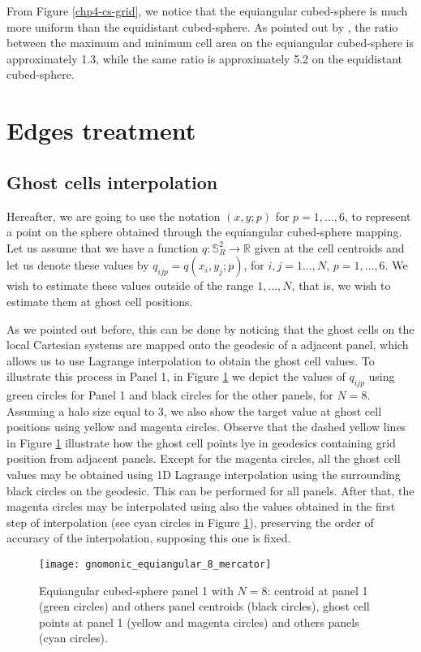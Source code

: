 From Figure \ref{chp4-cs-grid}, we notice that the equiangular cubed-sphere is much more uniform
than the equidistant cubed-sphere. As pointed out by \citet{rancic:1996}, the ratio
between the maximum and minimum cell area on the equiangular cubed-sphere is approximately 1.3,
while the same ratio is approximately 5.2 on the equidistant cubed-sphere. 

\section{Edges treatment}
\label{cs-halodata}
\subsection{Ghost cells interpolation}
\label{cs-interp}
Hereafter, we are going to use the notation $(x,y;p)$ for $p=1,\ldots, 6$, to represent a point on the sphere obtained through the equiangular cubed-sphere mapping.
Let us assume that we have a function $q: \mathbb{S}^2_R \to \mathbb{R}$
given at the cell centroids and let us denote these values by $q_{ijp} = q(x_i,y_j;p)$,
for $i, j=1\ldots, N$, $p=1,\ldots, 6$. We wish to estimate these values outside of the range $1, \ldots, N$, that is, we wish to estimate them at ghost cell positions.


As we pointed out before, this can be done by noticing that the ghost cells on the local
Cartesian systems are mapped onto the geodesic of a adjacent panel, which allows us to use Lagrange interpolation to obtain the ghost cell values.
To illustrate this process in Panel 1, in Figure \ref{chp4-cs-halodata} we depict the values of $q_{ijp}$ using green circles for Panel 1 and black circles for the other panels, for $N=8$. Assuming a halo size equal to 3, we also show the target value at ghost cell positions using yellow and magenta circles. Observe that the dashed yellow lines in Figure \ref{chp4-cs-halodata} illustrate
how the ghost cell points lye in geodesics containing grid position from adjacent panels. Except for the magenta circles,
all the ghost cell values may be obtained using 1D Lagrange interpolation using the surrounding black circles on the geodesic.
This can be performed for all panels. After that, the magenta circles may be interpolated using also the values obtained in the first step of interpolation
(see cyan circles in Figure \ref{chp4-cs-halodata}), preserving the order of accuracy of the interpolation, supposing this one is fixed. 
\begin{figure}[!htb]
	\centering
	\texttt{[image: gnomonic\_equiangular\_8\_mercator]}
	\caption{Equiangular cubed-sphere panel 1 with $N=8$: 
	centroid at panel 1 (green circles) and others panel centroids (black circles), 
	ghost cell points at panel 1 (yellow and magenta circles) and others panels (cyan circles).}
	\label{chp4-cs-halodata}
\end{figure}


